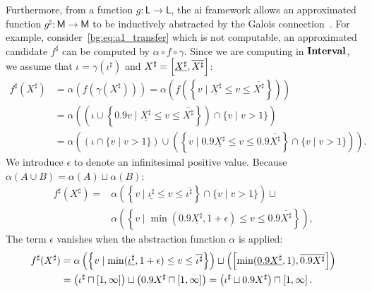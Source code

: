 Furthermore, from a function $g: \mathsf{L} \to \mathsf{L}$, the
\gls{ai} framework allows an approximated function $g^\sharp:
\mathsf{M} \to \mathsf{M}$ to be inductively abstracted by the Galois
connection~\cite{nielson99}.  For example, consider~\eqref{bg:eq:a1_transfer}
which is not computable, an approximated candidate $f^\sharp$ can be
computed by $\alpha \circ f \circ \gamma$.  Since we are computing in
$\mathbf{Interval}$, we assume that $\iota = \gamma(\iota^\sharp)$ and $X^\sharp =
\left[{\underline{X^\sharp}}, {\overline{X^\sharp}}\right]$:
\begin{equation}
    \begin{aligned}
        f^\sharp(X^\sharp)
        &= \alpha \left( f \left(
            \gamma \left( X^\sharp \right)
        \right) \right)
        = \alpha \left( f \left( \left\{
            v \mid \underline{X^\sharp} \leq v \leq \overline{X^\sharp}
        \right\} \right) \right) \\
        &= \alpha \left(
        \left(
            \iota \cup
            \left\{
                0.9 v \mid
                \underline{X^\sharp} \leq v \leq \overline{X^\sharp}
            \right\}
        \right) \cap \{ v \mid v > 1 \} \right) \\
        &= \alpha \left(
            \left( \iota \cap \{ v \mid v > 1 \} \right) \cup
            \left( \left\{
                v \mid
                0.9 \underline{X^\sharp} \leq v \leq 0.9 \overline{X^\sharp}
            \right\} \cap \{ v \mid v > 1 \} \right)
        \right).
    \end{aligned}
\end{equation}
We introduce $\epsilon$ to denote an infinitesimal positive value.  Because
$\alpha(A \cup B) = \alpha(A) \sqcup \alpha(B)$:
\begin{equation}
    \begin{aligned}
        f^\sharp(X^\sharp)
        ={} & \alpha \left( \left\{
            v \mid \underline{\iota^\sharp}
                \leq v \leq \overline{\iota^\sharp}
        \right\} \cap \{ v \mid v > 1 \} \right) \sqcup \\
        &
        \alpha \left( \left\{
            v \mid
            \min(0.9 \underline{X^\sharp}, 1 + \epsilon)
                \leq v \leq 0.9 \overline{X^\sharp}
        \right\} \right),
    \end{aligned}
\end{equation}
The term $\epsilon$ vanishes when the abstraction function $\alpha$ is applied:
\begin{equation}
    \begin{aligned}
        f^\sharp(X^\sharp)
        &= \alpha \left( \left\{
            v \mid
            \min(\underline{\iota^\sharp}, 1 + \epsilon)
                \leq v \leq \overline{\iota^\sharp}
        \right\} \right) \sqcup
        \left( \left[{
            \min(\underline{0.9X^\sharp}, 1)
        }, {\overline{0.9X^\sharp}}\right] \right) \\
        &= \left( \iota^\sharp \sqcap \left[{1}, {\infty}\right] \right) \sqcup
           \left( 0.9 X^\sharp \sqcap \left[{1}, {\infty}\right] \right)
         = \left( \iota^\sharp \sqcup 0.9 X^\sharp \right) \sqcap
           \left[{1}, {\infty}\right].
    \end{aligned}
\end{equation}
